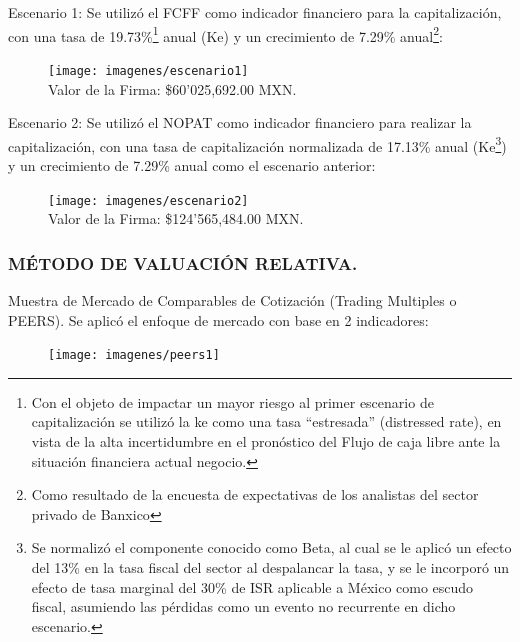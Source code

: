 \textcolor{principal}{Escenario 1:} Se utiliz\'o el FCFF como indicador financiero para la capitalizaci\'on, con una tasa de 19.73\%\footnote{Con el objeto de impactar un mayor riesgo al primer escenario de capitalizaci\'on se utiliz\'o la ke como una tasa ``estresada'' (distressed rate), en vista de la  alta incertidumbre en el pron\'ostico del Flujo de caja libre ante la situaci\'on financiera actual negocio.}  anual (Ke) y un crecimiento de 7.29\% anual\footnote{Como resultado de la encuesta de expectativas de los analistas del sector privado de Banxico}:

\begin{figure}[H]
\centering
\texttt{[image: imagenes/escenario1]}\\[1cm]


\textcolor{principal}{Valor de la Firma: \$60'025,692.00 MXN.}
\end{figure}

\espacio{1cm}
\textcolor{principal}{Escenario 2:} Se utiliz\'o el NOPAT como indicador financiero para realizar la capitalizaci\'on, con  una tasa de capitalizaci\'on normalizada de 17.13\% anual (Ke\footnote{Se normaliz\'o el componente conocido como Beta, al cual se le aplic\'o un efecto del 13\% en la tasa fiscal del sector al despalancar la tasa, y se le incorpor\'o un efecto de tasa marginal del 30\% de ISR aplicable a M\'exico como escudo fiscal, asumiendo las p\'erdidas como un evento no recurrente en dicho escenario.}) y un crecimiento de 7.29\% anual como el escenario anterior:

\begin{figure}[H]
\centering
\texttt{[image: imagenes/escenario2]}\\[1cm]


\textcolor{principal}{Valor de la Firma: \$124'565,484.00 MXN.}

\end{figure}

\subsubsection{M\'ETODO DE VALUACI\'ON RELATIVA.}

\textcolor{principal}{Muestra de Mercado de Comparables de Cotizaci\'on (Trading Multiples o PEERS)}. Se aplic\'o el enfoque de mercado con base en 2 indicadores:\\

\begin{figure}[H]
\centering
\texttt{[image: imagenes/peers1]}
\end{figure}

